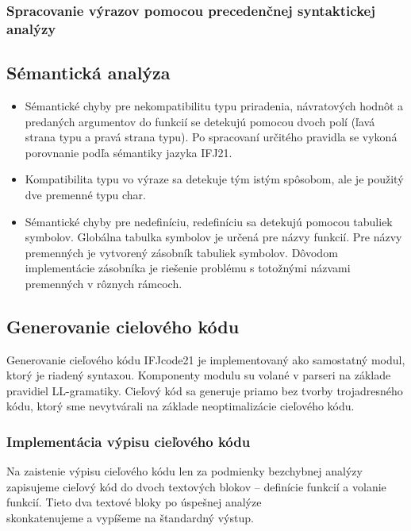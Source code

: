 \documentclass[a4paper, 11pt]{article}
\begin{document}
    \subsubsection{Spracovanie výrazov pomocou precedenčnej syntaktickej analýzy}


    \subsection{Sémantická analýza}


    \begin{itemize}
        \item Sémantické chyby pre nekompatibilitu typu priradenia, návratových hodnôt a predaných
        argumentov do funkcií se detekujú pomocou dvoch polí (ľavá strana typu a pravá strana typu). Po spracovaní
        určitého pravidla se vykoná porovnanie podľa sémantiky jazyka IFJ21.

        \item Kompatibilita typu vo výraze sa detekuje tým istým spôsobom, ale je použitý dve premenné typu char.

        \item Sémantické chyby pre nedefiníciu, redefiníciu sa detekujú pomocou tabuliek symbolov. Globálna tabulka
        symbolov je určená pre názvy funkcií. Pre názvy premenných je vytvorený zásobník
        tabuliek symbolov. Dôvodom implementácie zásobníka je riešenie problému s totožnými názvami premenných v
        rôznych rámcoch.
    \end{itemize}











    \subsection{Generovanie cielového kódu}
    Generovanie cieľového kódu IFJcode21 je implementovaný ako samostatný modul, ktorý je riadený syntaxou.
    Komponenty modulu su volané v parseri na základe pravidiel LL-gramatiky. Cieľový kód sa generuje
    priamo bez tvorby trojadresného kódu, ktorý sme nevytvárali na základe neoptimalizácie cieľového kódu.

    \subsubsection{Implementácia výpisu cieľového kódu}
    Na zaistenie výpisu cieľového kódu len za podmienky bezchybnej analýzy zapisujeme cieľový kód do dvoch textových
    blokov -- definície funkcií a volanie funkcií. Tieto dva textové bloky po úspešnej analýze\\ skonkatenujeme a
    vypíšeme na štandardný výstup.
\end{document}
